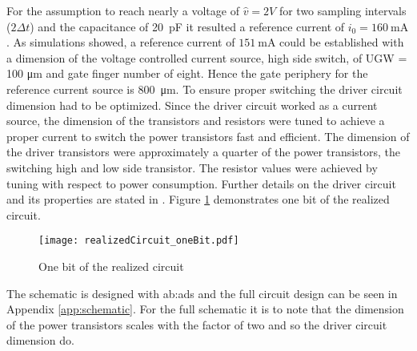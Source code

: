 For the assumption to reach nearly a voltage of $\hat{v} = 2V$ for two sampling intervals ($2 \Delta t$) and the capacitance of \SI{20}{\pico \farad} it resulted a reference current of $i_0 = \SI{160}{\milli \ampere}$.
As simulations showed, a reference current of $\SI{151}{\milli \ampere}$ could be established with a dimension of the voltage controlled current source, high side switch, of UGW = 100 \si{\micro \meter} and gate finger number of eight.
Hence the gate periphery for the reference current source is \SI{800}{\micro \meter}.
To ensure proper switching the driver circuit dimension had to be optimized.
Since the driver circuit worked as a current source, the dimension of the transistors and resistors were tuned to achieve a proper current to switch the power transistors fast and efficient.
The dimension of the driver transistors were approximately a quarter of the power transistors, the switching high and low side transistor.
The resistor values were achieved by tuning with respect to power consumption.
Further details on the driver circuit and its properties are stated in \cite{MaksimovicPaper}.
Figure \ref{fig:RealCircOne} demonstrates one bit of the realized circuit.

\begin{figure}[H]
	\centering
  \texttt{[image: realizedCircuit\_oneBit.pdf]}
	\caption{One bit of the realized circuit}
	\label{fig:RealCircOne}
\end{figure}

The schematic is designed with \gls{ab:ads} and the full circuit design can be seen in Appendix \ref{app:schematic}.
For the full schematic it is to note that the dimension of the power transistors scales with the factor of two and so the driver circuit dimension do.

